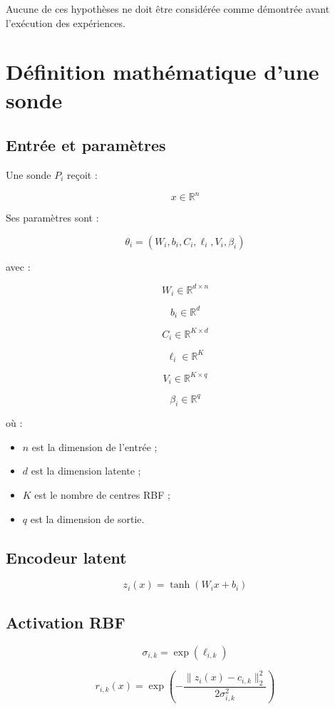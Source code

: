 \documentclass[11pt,a4paper]{article}
\newcommand{\R}{\mathbb{R}}
\begin{document}
Aucune de ces hypothèses ne doit être considérée
comme démontrée avant l'exécution des expériences.

\section{Définition mathématique d'une sonde}

\subsection{Entrée et paramètres}

Une sonde $P_i$ reçoit :

\[
x\in\R^n
\]

Ses paramètres sont :

\[
\theta_i=
(W_i,b_i,C_i,\ell_i,V_i,\beta_i)
\]

avec :

\[
W_i\in\R^{d\times n}
\]

\[
b_i\in\R^d
\]

\[
C_i\in\R^{K\times d}
\]

\[
\ell_i\in\R^K
\]

\[
V_i\in\R^{K\times q}
\]

\[
\beta_i\in\R^q
\]

où :
\begin{itemize}
    \item $n$ est la dimension de l'entrée ;
    \item $d$ est la dimension latente ;
    \item $K$ est le nombre de centres RBF ;
    \item $q$ est la dimension de sortie.
\end{itemize}

\subsection{Encodeur latent}

\[
z_i(x)=\tanh(W_i x+b_i)
\]

\subsection{Activation RBF}

\[
\sigma_{i,k}=\exp(\ell_{i,k})
\]

\[
r_{i,k}(x)=
\exp\left(
-\frac{
\|z_i(x)-c_{i,k}\|_2^2
}{
2\sigma_{i,k}^2
}
\right)
\]
\end{document}
